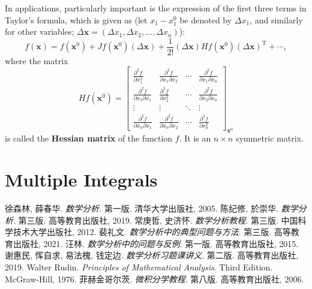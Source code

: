 \documentclass[11pt]{elegantbook}
\begin{document}
In applications, particularly important is the expression of the first three terms in Taylor's formula, which is given as
(let \(x_1 - x_1^0\) be denoted by \(\Delta x_1\), and similarly for other variables;
\(\Delta \mathbf{x} = (\Delta x_1, \Delta x_2, \dots, \Delta x_n)\)):
\[
    f(\mathbf{x}) = f(\mathbf{x}^0) + Jf(\mathbf{x}^0)(\Delta\mathbf{x})
    + \frac{1}{2!}(\Delta\mathbf{x})Hf(\mathbf{x}^0)(\Delta \mathbf{x})^{\mathrm{T}}+ \cdots,
\]
where the matrix
\[
Hf(\mathbf{x}^0) =
\begin{bmatrix}
\frac{\partial^2 f}{\partial x_1^2} & \frac{\partial^2 f}{\partial x_1 \partial x_2} 
    & \cdots & \frac{\partial^2 f}{\partial x_1 \partial x_n} \\
\frac{\partial^2 f}{\partial x_2 \partial x_1} & \frac{\partial^2 f}{\partial x_2^2} 
    & \cdots & \frac{\partial^2 f}{\partial x_2 \partial x_n} \\
\vdots & \vdots & \ddots & \vdots \\
\frac{\partial^2 f}{\partial x_n \partial x_1} & \frac{\partial^2 f}{\partial x_n \partial x_2} 
    & \cdots & \frac{\partial^2 f}{\partial x_n^2}
\end{bmatrix}_{\mathbf{x}^0}
\]
is called the \textbf{Hessian matrix} of the function \(f\). It is an \(n \times n\) symmetric matrix.


\chapter{Multiple Integrals}




\begin{thebibliography}{99} 
 徐森林, 薛春华. \emph{数学分析}. 第一版. 清华大学出版社, 2005.
 陈纪修, 於崇华. \emph{数学分析}. 第三版. 高等教育出版社, 2019.
 常庚哲, 史济怀. \emph{数学分析教程}. 第三版. 中国科学技术大学出版社, 2012.
 裴礼文. \emph{数学分析中的典型问题与方法}. 第三版. 高等教育出版社, 2021.
 汪林. \emph{数学分析中的问题与反例}. 第一版. 高等教育出版社, 2015.
 谢惠民, 恽自求, 易法槐, 钱定边. \emph{数学分析习题课讲义}. 第二版. 高等教育出版社, 2019.
 Walter Rudin. \emph{Principles of Mathematical Analysis}. Third Edition. McGraw-Hill, 1976.
 菲赫金哥尔茨. \emph{微积分学教程}. 第八版. 高等教育出版社, 2006.
\end{thebibliography}
\end{document}
